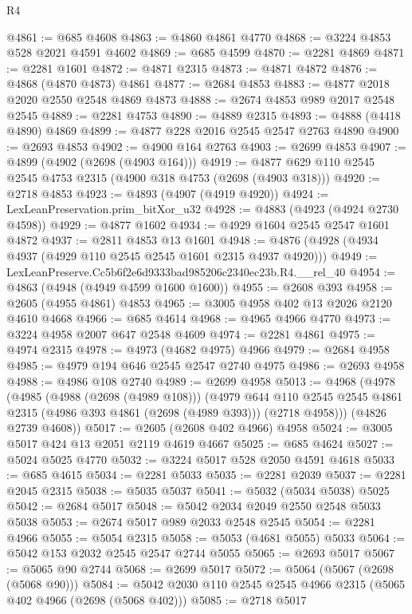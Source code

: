 \begin{lexlean}{R4}
\begin{coremodule}
@4861 := @685 @4608
@4863 := @4860 @4861 @4770
@4868 := @3224 @4853 @528 @2021 @4591 @4602
@4869 := @685 @4599
@4870 := @2281 @4869
@4871 := @2281 @1601
@4872 := @4871 @2315
@4873 := @4871 @4872
@4876 := @4868 (@4870 @4873) @4861
@4877 := @2684 @4853
@4883 := @4877 @2018 @2020 @2550 @2548 @4869 @4873
@4888 := @2674 @4853 @989 @2017 @2548 @2545
@4889 := @2281 @4753
@4890 := @4889 @2315
@4893 := @4888 (@4418 @4890) @4869
@4899 := @4877 @228 @2016 @2545 @2547 @2763 @4890
@4900 := @2693 @4853
@4902 := @4900 @164 @2763
@4903 := @2699 @4853
@4907 := @4899 (@4902 (@2698 (@4903 @164)))
@4919 := @4877 @629 @110 @2545 @2545 @4753 @2315 (@4900 @318 @4753 (@2698 (@4903 @318)))
@4920 := @2718 @4853
@4923 := @4893 (@4907 (@4919 @4920))
@4924 := LexLeanPreservation.prim_bitXor_u32
@4928 := @4883 (@4923 (@4924 @2730 @4598))
@4929 := @4877 @1602
@4934 := @4929 @1604 @2545 @2547 @1601 @4872
@4937 := @2811 @4853 @13 @1601
@4948 := @4876 (@4928 (@4934 @4937 (@4929 @110 @2545 @2545 @1601 @2315 @4937 @4920)))
@4949 := LexLeanPreserve.Cc5b6f2e6d9333bad985206c2340ec23b.R4.__rel_40
@4954 := @4863 (@4948 (@4949 @4599 @1600 @1600))
@4955 := @2608 @393
@4958 := @2605 (@4955 @4861) @4853
@4965 := @3005 @4958 @402 @13 @2026 @2120 @4610 @4668
@4966 := @685 @4614
@4968 := @4965 @4966 @4770
@4973 := @3224 @4958 @2007 @647 @2548 @4609
@4974 := @2281 @4861
@4975 := @4974 @2315
@4978 := @4973 (@4682 @4975) @4966
@4979 := @2684 @4958
@4985 := @4979 @194 @646 @2545 @2547 @2740 @4975
@4986 := @2693 @4958
@4988 := @4986 @108 @2740
@4989 := @2699 @4958
@5013 := @4968
    (@4978
      (@4985
        (@4988 (@2698 (@4989 @108)))
        (@4979
          @644
          @110
          @2545
          @2545
          @4861
          @2315
          (@4986 @393 @4861 (@2698 (@4989 @393)))
          (@2718 @4958)))
      (@4826 @2739 @4608))
@5017 := @2605 (@2608 @402 @4966) @4958
@5024 := @3005 @5017 @424 @13 @2051 @2119 @4619 @4667
@5025 := @685 @4624
@5027 := @5024 @5025 @4770
@5032 := @3224 @5017 @528 @2050 @4591 @4618
@5033 := @685 @4615
@5034 := @2281 @5033
@5035 := @2281 @2039
@5037 := @2281 @2045 @2315
@5038 := @5035 @5037
@5041 := @5032 (@5034 @5038) @5025
@5042 := @2684 @5017
@5048 := @5042 @2034 @2049 @2550 @2548 @5033 @5038
@5053 := @2674 @5017 @989 @2033 @2548 @2545
@5054 := @2281 @4966
@5055 := @5054 @2315
@5058 := @5053 (@4681 @5055) @5033
@5064 := @5042 @153 @2032 @2545 @2547 @2744 @5055
@5065 := @2693 @5017
@5067 := @5065 @90 @2744
@5068 := @2699 @5017
@5072 := @5064 (@5067 (@2698 (@5068 @90)))
@5084 := @5042 @2030 @110 @2545 @2545 @4966 @2315 (@5065 @402 @4966 (@2698 (@5068 @402)))
@5085 := @2718 @5017

\end{coremodule}
\end{lexlean}
